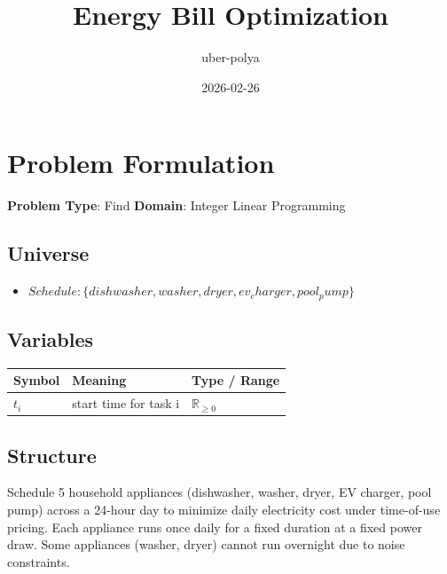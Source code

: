 \documentclass[11pt, a4paper]{article}
\title{Energy Bill Optimization}
\author{uber-polya}
\date{2026-02-26}
\begin{document}
\maketitle
\tableofcontents
\newpage

\section{Problem Formulation}

\begin{polyamodel}

\textbf{Problem Type}: Find \hfill
\textbf{Domain}: Integer Linear Programming


\end{polyamodel}

\subsection{Universe}

\begin{itemize}
  \item $Schedule: \{dishwasher, washer, dryer, ev_charger, pool_pump\}$
\end{itemize}

\subsection{Variables}

\begin{longtable}{lll}
\toprule
\textbf{Symbol} & \textbf{Meaning} & \textbf{Type / Range} \\
\midrule
\endhead
$t_i$ & start time for task i & $\mathbb{{R}}_{\ge 0}$ \\
\bottomrule
\end{longtable}

\subsection{Structure}

Schedule 5 household appliances (dishwasher, washer, dryer, EV charger, pool pump)
across a 24-hour day to minimize daily electricity cost under time-of-use pricing.
Each appliance runs once daily for a fixed duration at a fixed power draw.
Some appliances (washer, dryer) cannot run overnight due to noise constraints.
\end{document}
